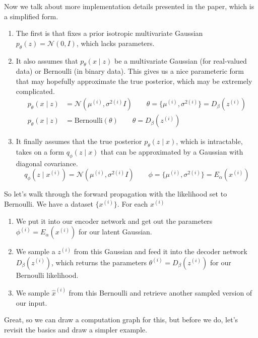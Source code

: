   Now we talk about more implementation details presented in the paper, which is a simplified form. 
  \begin{enumerate}
    \item The first is that \cite{vae} fixes a prior isotropic multivariate Gaussian $p_\theta (z) = \mathcal{N}(0, I)$, which lacks parameters. 

    \item It also assumes that $p_\theta (x \mid z)$ be a multivariate Gaussian (for real-valued data) or Bernoulli (in binary data). This gives us a nice parameteric form that may hopefully approximate the true posterior, which may be extremely complicated. 
    \begin{align}
      p_\theta (x \mid z) & = \mathcal{N}(\mu^{(i)}, \sigma^{2(i)} I) \qquad \theta = \{\mu^{(i)}, \sigma^{2 (i)} \} = D_\beta (z^{(i)}) \\
      p_\theta (x \mid z) & = \mathrm{Bernoulli}(\theta) \qquad \theta = D_\beta (z^{(i)}) 
    \end{align}

    \item It finally assumes that the true posterior $p_\theta (z \mid x)$, which is intractable, takes on a form $q_\phi (z \mid x)$ that can be approximated by a Gaussian with diagonal covariance. 
    \begin{equation}
      q_\phi (z \mid x^{(i)}) = \mathcal{N}(\mu^{(i)}, \sigma^{2 (i)} I) \qquad \phi = \{\mu^{(i)}, \sigma^{2 (i)} \} = E_\alpha (x^{(i)})
    \end{equation}
  \end{enumerate} 

  So let's walk through the forward propagation with the likelihood set to Bernoulli. We have a dataset $\{x^{(i)}\}$. For each $x^{(i)}$
  \begin{enumerate}
    \item We put it into our encoder network and get out the parameters $\phi^{(i)} = E_\alpha (x^{(i)})$ for our latent Gaussian. 
    \item We sample a $z^{(i)}$ from this Gaussian and feed it into the decoder network $D_\beta(z^{(i)})$, which returns the parameters $\theta^{(i)} = D_\beta (z^{(i)})$ for our Bernoulli likelihood. 
    \item We sample $\hat{x}^{(i)}$ from this Bernoulli and retrieve another sampled version of our input. 
  \end{enumerate} 

  Great, so we can draw a computation graph for this, but before we do, let's revisit the basics and draw a simpler example. 

